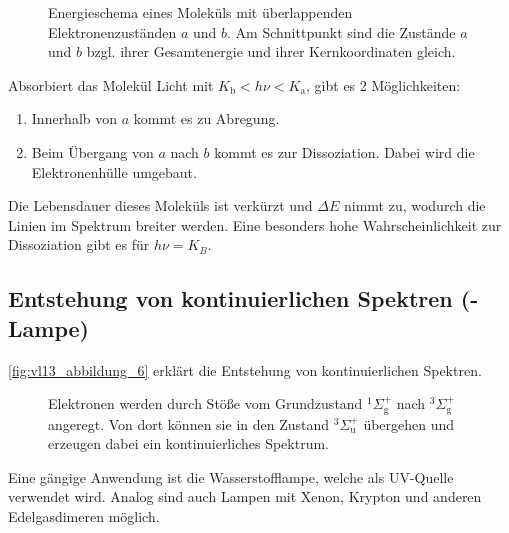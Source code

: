 	\begin{figure}[H]
		\centering
		\caption{Energieschema eines Moleküls mit überlappenden Elektronenzuständen $a$ und $b$. 
			Am Schnittpunkt sind die Zustände $a$ und $b$ bzgl. ihrer Gesamtenergie und ihrer Kernkoordinaten gleich.
		}
		\label{fig:vl13_abbildung_5}
	\end{figure}

	
	Absorbiert das Molekül Licht mit $K_{\text{b}}< h\nu < K_{\mathrm{a}}$, gibt es 2 Möglichkeiten:
	\begin{enumerate}
		\item Innerhalb von $a$ kommt es zu Abregung.
		\item Beim Übergang von $a$ nach $b$ kommt es zur Dissoziation. Dabei wird die Elektronenhülle umgebaut. 
	\end{enumerate}
	Die Lebensdauer dieses Moleküls ist verkürzt und $\Delta E$ nimmt zu, wodurch die Linien im Spektrum breiter werden. Eine besonders hohe Wahrscheinlichkeit zur Dissoziation gibt es für $h\nu = K_{B}$.

\subsection{Entstehung von kontinuierlichen Spektren (\texorpdfstring{}{H2}-Lampe)}
\autoref{fig:vl13_abbildung_6} erklärt die Entstehung von kontinuierlichen Spektren.
\begin{figure}[H]
    \centering
	\caption{Elektronen werden durch Stöße vom Grundzustand $^1\Sigma_\mathrm g^+$ nach $^3\Sigma_\mathrm g^+$ angeregt. 
		Von dort können sie in den Zustand $^3\Sigma_\mathrm u ^+$ übergehen und erzeugen dabei ein kontinuierliches Spektrum.
	}
    \label{fig:vl13_abbildung_6}
\end{figure}
Eine gängige Anwendung ist die Wasserstofflampe, welche als UV-Quelle verwendet wird. Analog sind auch Lampen mit Xenon, Krypton und anderen Edelgasdimeren möglich.
